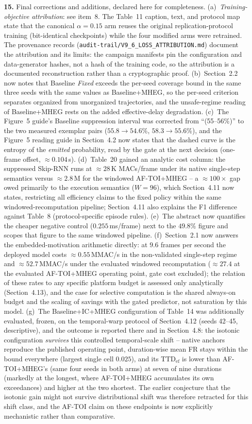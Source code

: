 \documentclass[1p,12pt,authoryear]{elsarticle}
\providecommand{\revcolor}{black}%
\begin{document}
{\color{\revcolor}\noindent \textbf{15.} Final corrections and additions, declared here for completeness. (a)~\emph{Training-objective attribution}: see item~8. The Table~11 caption, text, and protocol map state that the canonical $\alpha{=}0.15$ arm reuses the original replication-protocol training (bit-identical checkpoints) while the four modified arms were retrained. The provenance records (\texttt{audit-trail/V9\_6\_LOSS\_ATTRIBUTION.md}) document the attribution and its limits: the campaign manifests pin the configuration and data-generator hashes, not a hash of the training code, so the attribution is a documented reconstruction rather than a cryptographic proof. (b)~Section~2.2 now notes that Baseline \emph{Fixed} exceeds the per-seed coverage bound in the same three seeds with the same values as Baseline+MHEG, so the per-seed criterion separates organized from unorganized trajectories, and the unsafe-regime reading of Baseline+MHEG rests on the added effective-delay degradation. (c)~The Figure~5 guide's Baseline suppression interval was corrected from ``(55--56\%)'' to the two measured exemplar pairs ($55.8{\rightarrow}54.6\%$, $58.3{\rightarrow}55.6\%$), and the Figure~5 reading guide in Section~4.2 now states that the dashed curve is the entropy of the \emph{emitted} probability, read by the gate at the next decision (one-frame offset, ${\approx}0.104$\,s). (d)~Table~20 gained an analytic cost column: the suppressed Skip-RNN runs at ${\approx}28$\,K MACs/frame under its native single-step semantics versus ${\approx}2.8$\,M for the windowed AF-TOI+MHEG -- a ${\approx}100\times$ gap owed primarily to the execution semantics ($W{=}96$), which Section~4.11 now states, restricting all efficiency claims to the fixed policy within the same windowed-recomputation pipeline; Section~4.11 also explains the F1 difference against Table~8 (protocol-specific episode rules). (e)~The abstract now quantifies the cheaper negative control ($0.255$\,ms/frame) next to the $49.8\%$ figure and scopes that figure to the same windowed pipeline. (f)~Section~2.1 now answers the embedded-motivation arithmetic directly: at $9.6$ frames per second the deployed model costs ${\approx}0.55$\,MMAC/s in the non-validated single-step regime and ${\approx}52.7$\,MMAC/s under the evaluated windowed recomputation (${\approx}27.4$ at the evaluated AF-TOI+MHEG operating point, gate cost excluded); the relation of these rates to any specific platform budget is assessed only analytically (Section~4.13), and the case for selective computation is the shared always-on budget and the scaling of savings with the gated predictor, not saturation by this model. (g)~The Baseline+IC+MHEG configuration of Table~14 was additionally evaluated, frozen, on the temporal-warp protocol of Section~4.12 (seeds 42--45, descriptive), and the outcome is reported there and in Section~4.8: the isotonic configuration \emph{survives} this controlled temporal-scale shift -- native anchors reproduce the published operating point, duration-wise mean FR stays within the bound everywhere (largest single cell $0.025$), and its $\mathrm{TTD}_{\mathrm{ef}}$ is lower than AF-TOI+MHEG's (same four seeds in both arms) at seven of nine durations (markedly at the longest, where AF-TOI+MHEG accumulates its own exceedances) and higher at the two shortest. The earlier conjecture that the isotonic gain might not survive distributional shift was therefore retracted for this shift class, and the AF-TOI claim on these endpoints is now explicitly mechanistic rather than comparative.}
\end{document}

